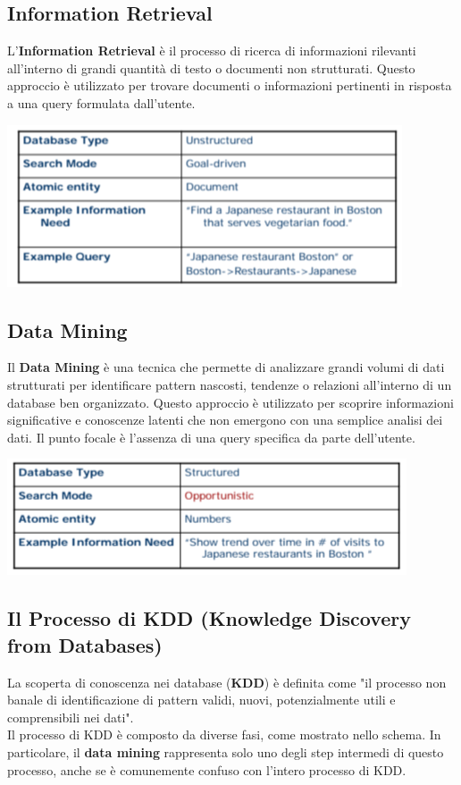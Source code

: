 \documentclass{report}
\begin{document}
	\subsection{Information Retrieval}
	L'\textbf{Information Retrieval} è il processo di ricerca di informazioni rilevanti all'interno di grandi quantità di testo o documenti non strutturati. Questo approccio è utilizzato per trovare documenti o informazioni pertinenti in risposta a una query formulata dall'utente.
	\begin{center}
		\includegraphics[scale=0.6]{assets/inforetrieval.png}
	\end{center}

	\subsection{Data Mining}
	Il \textbf{Data Mining} è una tecnica che permette di analizzare grandi volumi di dati strutturati per identificare pattern nascosti, tendenze o relazioni all'interno di un database ben organizzato. Questo approccio è utilizzato per scoprire informazioni significative e conoscenze latenti che non emergono con una semplice analisi dei dati. Il punto focale è l'assenza di una query specifica da parte dell'utente.
	\begin{center}
		\includegraphics[scale=0.6]{assets/datamining.png}
	\end{center}

	\subsection{Il Processo di KDD (Knowledge Discovery from Databases)}
	La scoperta di conoscenza nei database (\textbf{KDD}) è definita come "il processo non banale di identificazione di pattern validi, nuovi, potenzialmente utili e comprensibili nei dati".
	\vspace{\baselineskip}\\
	Il processo di KDD è composto da diverse fasi, come mostrato nello schema. In particolare, il \textbf{data mining} rappresenta solo uno degli step intermedi di questo processo, anche se è comunemente confuso con l'intero processo di KDD.
\end{document}
